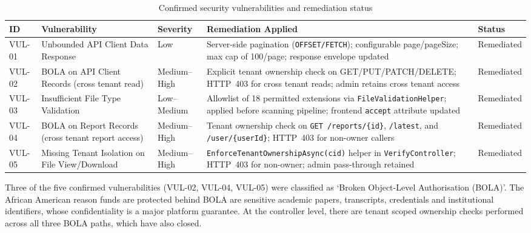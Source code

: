 \begin{table}[H]
  \vspace{2ex}
  \centering
  \footnotesize
  {%
  \setlength{\tabcolsep}{5pt}
  \renewcommand{\arraystretch}{1.3}
  \begin{tabular}{|>{\centering\arraybackslash}p{}|
                  >{\raggedright\arraybackslash}p{}|
                  >{\centering\arraybackslash}p{}|
                  >{\raggedright\arraybackslash}p{}|
                  >{\centering\arraybackslash}p{}|}
    \hline
    \textbf{ID} & \textbf{Vulnerability} & \textbf{Severity} & \textbf{Remediation Applied} & \textbf{Status} \\
    \hline\hline
    VUL-01 & Unbounded API Client Data Response & Low & Server-side pagination (\texttt{OFFSET/FETCH}); configurable page/pageSize; max cap of 100/page; response envelope updated & Remediated \\
    \hline
    VUL-02 & BOLA on API Client Records (cross tenant read) & Medium--High & Explicit tenant ownership check on GET/PUT/PATCH/DELETE; HTTP~403 for cross tenant reads; admin retains cross tenant access & Remediated \\
    \hline
    VUL-03 & Insufficient File Type Validation & Low--Medium & Allowlist of 18 permitted extensions via \texttt{FileValidationHelper}; applied before scanning pipeline; frontend \texttt{accept} attribute updated & Remediated \\
    \hline
    VUL-04 & BOLA on Report Records (cross tenant report access) & Medium--High & Tenant ownership check on \texttt{GET /reports/\{id\}}, \texttt{/latest}, and \texttt{/user/\{userId\}}; HTTP~403 for non-owner callers & Remediated \\
    \hline
    VUL-05 & Missing Tenant Isolation on File View/Download & Medium--High & \texttt{EnforceTenantOwnershipAsync(cid)} helper in \texttt{VerifyController}; HTTP~403 for non-owner; admin pass-through retained & Remediated \\
    \hline
  \end{tabular}
  }%
  \vspace{2ex}
  \captionsetup{type=table}
  \caption{Confirmed security vulnerabilities and remediation status}
  \label{tab:security-detail}
\end{table}

\noindent Three of the five confirmed vulnerabilities (VUL-02, VUL-04, VUL-05) were classified as ‘Broken Object-Level Authorisation (BOLA)'. The African American reason funds are protected behind BOLA are sensitive academic papers, transcripts, credentials and institutional identifiers, whose confidentiality is a major platform guarantee. At the controller level, there are tenant scoped ownership checks performed across all three BOLA paths, which have also closed.

